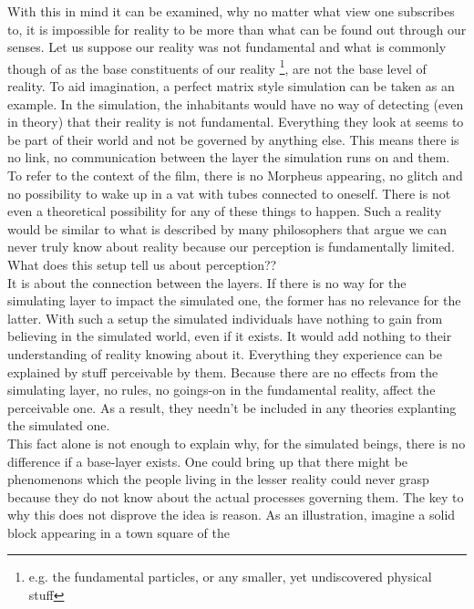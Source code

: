 \documentclass[fleqn,14pt]{article}
\begin{document}
With this in mind it can be examined, why no matter what view one subscribes to, it is impossible for reality
to be more than what can be found out through our senses.
Let us suppose our reality was not fundamental
and what is commonly though of as the base constituents of our reality \footnote{e.g. the fundamental
particles, or any smaller, yet undiscovered physical stuff}, are not the base level of reality.
To aid imagination, a perfect matrix style simulation can be taken as an example. In the simulation,
the inhabitants would have no way of detecting (even in theory) that their reality is not fundamental.
Everything they look at seems to be part of their world and not be governed by anything else. This means
there is no link, no communication between the layer
the simulation runs on and them. To refer to the context of the film, there is no Morpheus appearing,
no glitch and no possibility to wake up in a vat with tubes connected to oneself. There is not even a 
theoretical possibility for any of these things to happen. Such a reality would be similar to what is
described by many philosophers that argue we can never truly know about reality because our perception
is fundamentally limited.\\
What does this setup tell us about perception??\\
It is about the connection between the layers. If there is no way for the simulating layer to impact 
the simulated one, the former has no relevance for the latter. With such a setup the simulated
individuals have nothing to gain from believing in the simulated world, even if it exists. It would
add nothing to their understanding of reality knowing about it. Everything they experience can be explained
by stuff perceivable by them. Because there are no effects from the simulating layer, no rules,
no goings-on in the fundamental reality, affect the perceivable one.
As a result, they needn't be included in any theories explanting the simulated one. \\
This fact alone is not enough to explain why, for the simulated beings, there is no difference if a base-layer
exists.
One could bring up that there might be phenomenons which the people living in the lesser reality could never
grasp because they do not know about the actual processes governing them. The key to why this does not disprove
the idea is reason. As an illustration, imagine a solid block appearing in a town square of the
\end{document}
